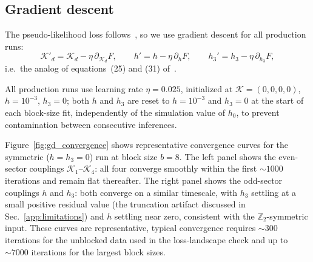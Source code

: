 \documentclass[a4paper, 11pt]{article}
\begin{document}
\subsection{Gradient descent}
\label{app:gradient_descent}

The pseudo-likelihood loss follows~\cite{blocking}, so we use gradient descent for all production runs:
\begin{equation}
  \mathcal{K}'_d = \mathcal{K}_d - \eta\,\partial_{\mathcal{K}_d} F,
  \qquad
  h'   = h   - \eta\,\partial_h F,
  \qquad
  h_3' = h_3 - \eta\,\partial_{h_3} F,
  \label{eq:GD}
\end{equation}
i.e.\ the analog of equations~(25) and (31) of~\cite{blocking}.

All production runs use learning rate $\eta = 0.025$, initialized at $\mathcal{K} = (0,0,0,0)$, $h = 10^{-3}$, $h_3 = 0$; both $h$ and $h_3$ are reset to $h=10^{-3}$ and $h_3=0$ at the start of each block-size fit, independently of the simulation value of $h_0$, to prevent contamination between consecutive inferences.

Figure~\ref{fig:gd_convergence} shows representative convergence curves for the symmetric ($h=h_3=0$) run at block size $b=8$. The left panel shows the even-sector couplings $\mathcal{K}_1$--$\mathcal{K}_4$: all four converge smoothly within the first $\sim1000$ iterations and remain flat thereafter. The right panel shows the odd-sector couplings $h$ and $h_3$: both converge on a similar timescale, with $h_3$ settling at a small positive residual value (the truncation artifact discussed in Sec.~\ref{app:limitations}) and $h$ settling near zero, consistent with the $\mathbb{Z}_2$-symmetric input. These curves are representative, typical convergence requires $\sim300$ iterations for the unblocked data used in the loss-landscape check and up to $\sim7000$ iterations for the largest block sizes.
\end{document}
